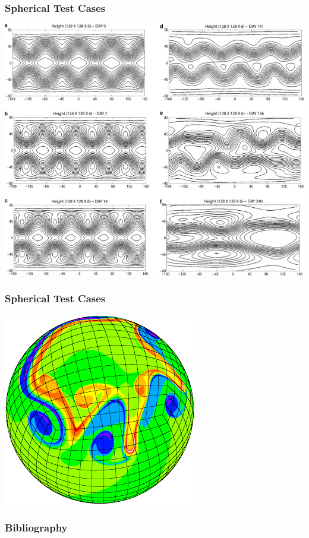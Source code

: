 \documentclass[10pt]{beamer}
\begin{document}
      \begin{frame}
        \frametitle{Spherical Test Cases}
        \centering
        \includegraphics[scale=2.0]{Figures/rossby_test_case.jpg}
      \end{frame}

      \begin{frame}
        \frametitle{Spherical Test Cases}
        \centering
        \includegraphics[scale=0.6]{Figures/cubed_sphere_vorticity.png}
      \end{frame}

    \begin{frame}[allowframebreaks]
      \frametitle{Bibliography}
      \nocite{*}
      \printbibliography{}
    \end{frame}
\end{document}
